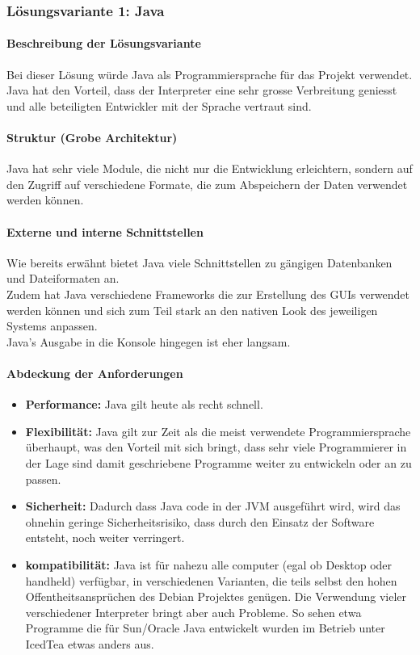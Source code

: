 \documentclass[10pt,paper=a4,final]{scrartcl}
\begin{document}
\subsubsection{L\"osungsvariante 1: Java}
\paragraph{Beschreibung der L\"osungsvariante}
Bei dieser L\"osung w\"urde Java als Programmiersprache f\"ur das Projekt verwendet. Java hat den Vorteil, dass der Interpreter eine sehr grosse Verbreitung geniesst und alle beteiligten Entwickler mit der Sprache vertraut sind.
\paragraph{Struktur (Grobe Architektur)}
Java hat sehr viele Module, die nicht nur die Entwicklung erleichtern, sondern auf den Zugriff auf verschiedene Formate, die zum Abspeichern der Daten verwendet werden k\"onnen.
\paragraph{Externe und interne Schnittstellen}
Wie bereits erw\"ahnt bietet Java viele Schnittstellen zu g\"angigen Datenbanken und Dateiformaten an.\\
Zudem hat Java verschiedene Frameworks die zur Erstellung des GUIs verwendet werden k\"onnen und sich zum Teil stark an den nativen Look des jeweiligen Systems anpassen.\\
Java’s Ausgabe in die Konsole hingegen ist eher langsam.\\
\paragraph{Abdeckung der Anforderungen}
\begin{itemize}
  \item {\bf Performance:} Java gilt heute als recht schnell.
  \item {\bf Flexibilit\"at:} Java gilt zur Zeit als die meist verwendete Programmiersprache \"uberhaupt, was den Vorteil mit sich bringt, dass sehr viele Programmierer in der Lage sind damit geschriebene Programme weiter zu entwickeln oder an zu passen.
  \item {\bf Sicherheit:} Dadurch dass Java code in der JVM ausgef\"uhrt wird, wird das ohnehin geringe Sicherheitsrisiko, dass durch den Einsatz der Software entsteht, noch weiter verringert.
  \item {\bf kompatibilit\"at:} Java ist f\"ur nahezu alle computer (egal ob Desktop oder handheld) verf\"ugbar, in verschiedenen Varianten, die teils selbst den hohen Offentheitsanspr\"uchen des Debian Projektes gen\"ugen. Die Verwendung vieler verschiedener Interpreter bringt aber auch Probleme. So sehen etwa Programme die f\"ur Sun/Oracle Java entwickelt wurden im Betrieb unter IcedTea etwas anders aus.
\end{itemize}
\end{document}
